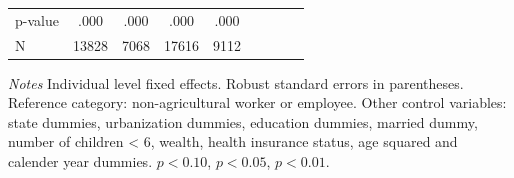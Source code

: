 \begin{table}[p]
\begin{center}
\begin{adjustbox}{max width=\linewidth}
\begin{threeparttable}
{\begin{tabular}{l*{4}{SS}}
\hspace*{10mm} p-value         &     .000         &     .000         &     .000         &     .000         \\
N               &    13828         &     7068         &    17616         &     9112         \\
\bottomrule
\end{tabular}
\begin{tablenotes}
\item \footnotesize \textit{Notes} Individual level fixed effects. Robust standard errors in parentheses. Reference category: non-agricultural worker or employee. Other control variables: state dummies, urbanization dummies, education dummies, married dummy, number of children < 6, wealth, health insurance status, age squared and calender year dummies. \sym{*} \(p<0.10\), \sym{**} \(p<0.05\), \sym{***} \(p<0.01\).
\end{tablenotes}
}
\end{threeparttable}
\end{adjustbox}
\end{center}
\end{table}

 



